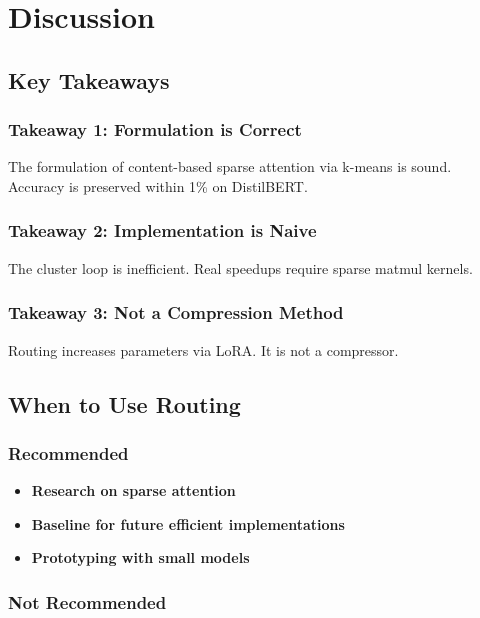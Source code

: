 
\section{Discussion}

\subsection{Key Takeaways}

\subsubsection{Takeaway 1: Formulation is Correct}

The formulation of content-based sparse attention via k-means is sound. 
Accuracy is preserved within 1\% on DistilBERT.

\subsubsection{Takeaway 2: Implementation is Naive}

The cluster loop is inefficient. Real speedups require sparse matmul kernels.

\subsubsection{Takeaway 3: Not a Compression Method}

Routing increases parameters via LoRA. It is not a compressor.

\subsection{When to Use Routing}

\subsubsection{Recommended}

\begin{itemize}
\item \textbf{Research on sparse attention}
\item \textbf{Baseline for future efficient implementations}
\item \textbf{Prototyping with small models}

\end{itemize}
\subsubsection{Not Recommended}

